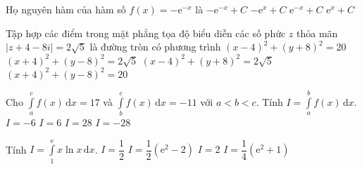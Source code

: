 \begin{ex}%
Họ nguyên hàm của hàm số $f(x)=-\mathrm{e}^{-x}$ là
\choice
{$-\mathrm{e}^{-x}+C$}
{$-\mathrm{e}^{x}+C$}
{\True $\mathrm{e}^{-x}+C$}
{$\mathrm{e}^{x}+C$}

\end{ex}


\begin{ex}%
Tập hợp các điểm trong mặt phẳng tọa độ biểu diễn các số phức $z$ thỏa mãn $|z+4-8i|=2\sqrt{5}$ là đường tròn có phương trình
\choice
{$(x-4)^2+(y+8)^2=20$}
{$(x+4)^2+(y-8)^2=2\sqrt{5}$}
{$(x-4)^2+(y+8)^2=2\sqrt{5}$}
{\True $(x+4)^2+(y-8)^2=20$}

\end{ex}


\begin{ex}%
Cho $\displaystyle \int \limits_a^c f(x) \mathrm{\,d}x=17$ và $\displaystyle \int \limits_b^c f(x) \mathrm{\,d}x=-11$ với $a<b<c$. Tính $I=\displaystyle \int \limits_a^b f(x) \mathrm{\,d}x$.
\choice
{$I=-6$}
{$I=6$}
{\True $I=28$}
{$I=-28$}

\end{ex}


\begin{ex}%
Tính $I=\displaystyle \int \limits_1^{\mathrm{e}}x\ln x \mathrm{\,d}x$.
\choice
{$I=\dfrac{1}{2}$}
{$I=\dfrac{1}{2}(\mathrm{e}^2-2)$}
{$I=2$}
{\True $I=\dfrac{1}{4}(\mathrm{e}^2+1)$}

\end{ex}



